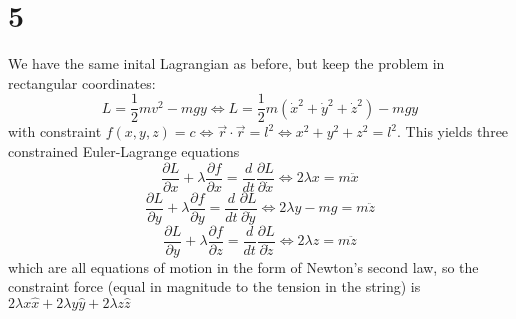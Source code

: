 \documentclass{article}
\begin{document}
\section*{5}
We have the same inital Lagrangian as before, but keep the problem in rectangular coordinates:
\[L=\frac{1}{2}mv^2-mgy\Leftrightarrow L=\frac{1}{2}m(\dot{x}^2+\dot{y}^2+\dot{z}^2)-mgy\]
with constraint $f(x,y,z)=c\Leftrightarrow\vec{r}\cdot\vec{r}=l^2\Leftrightarrow x^2+y^2+z^2=l^2$.
This yields three constrained Euler-Lagrange equations
\[\frac{\partial L}{\partial x}+\lambda\frac{\partial f}{\partial x}=\frac{d}{dt}\frac{\partial L}{\partial \dot{x}}\Leftrightarrow2\lambda x=m\ddot{x}\]
\[\frac{\partial L}{\partial y}+\lambda\frac{\partial f}{\partial y}=\frac{d}{dt}\frac{\partial L}{\partial \dot{y}}\Leftrightarrow2\lambda y-mg=m\ddot{z}\]
\[\frac{\partial L}{\partial y}+\lambda\frac{\partial f}{\partial z}=\frac{d}{dt}\frac{\partial L}{\partial \dot{z}}\Leftrightarrow2\lambda z=m\ddot{z}\]
which are all equations of motion in the form of Newton's second law, so the constraint force (equal in magnitude to the tension in the string) is $2\lambda x\hat{x}+2\lambda y\hat{y}+2\lambda z\hat{z}$
\end{document}
